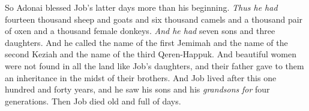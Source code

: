 \begin{biblechapter}
\verse So Adonai blessed Job’s latter days more than his beginning. \textit{Thus he had} fourteen thousand sheep and goats and six thousand camels and a thousand pair of oxen and a thousand female donkeys.
\verse \textit{And he had} seven sons and three daughters.
\verse And he called the name of the first Jemimah and the name of the second Keziah and the name of the third Qeren-Happuk.
\verse And beautiful women were not found in all the land like Job’s daughters, and their father gave to them an inheritance in the midst of their brothers.
\verse And Job lived after this one hundred and forty years, and he saw his sons and his \textit{grandsons} \textit{for} four generations.
\verse Then Job died old and full of days.
\end{biblechapter}

